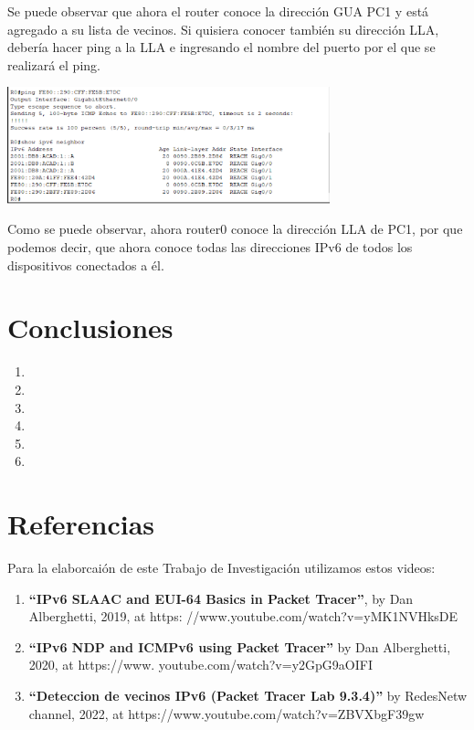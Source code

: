 \documentclass[12pt]{article}
\begin{document}
 Se puede observar que ahora el router conoce la dirección GUA PC1 y está agregado a su lista de vecinos. Si quisiera conocer también su dirección LLA, debería hacer ping a la LLA e ingresando el nombre del puerto por el que se realizará el ping.
 
 \begin{center}
 	\includegraphics[width=0.7\textwidth]{../tpipv6/imagenes/imagen7}
 \end{center}
 
 Como se puede observar, ahora router0 conoce la dirección LLA de PC1, por que podemos decir, que ahora conoce todas las direcciones IPv6 de todos los dispositivos conectados a él.
 
 \section{Conclusiones}
 
 \begin{enumerate}
 	\item 
 	
 	\item 
 	
 	\item 
 	
 	\item 
 	
 	\item 
 	
 	\item 
 	
 \end{enumerate}
 
 \section{Referencias}
 Para la elaborcaión de este Trabajo de Investigación utilizamos estos videos:
 
  \begin{enumerate}
 	\item \textbf{“IPv6 SLAAC and EUI-64 Basics in Packet Tracer”}, by Dan Alberghetti, 2019, at https:
 	//www.youtube.com/watch?v=yMK1NVHksDE
 	
 	\item \textbf{“IPv6 NDP and ICMPv6 using Packet Tracer”} by Dan Alberghetti, 2020, at https://www.
 	youtube.com/watch?v=y2GpG9aOIFI
 	
 	\item \textbf{“Deteccion de vecinos IPv6 (Packet Tracer Lab 9.3.4)”} by RedesNetw channel, 2022, at
 	https://www.youtube.com/watch?v=ZBVXbgF39gw
 	
 \end{enumerate}
 
\end{document}

